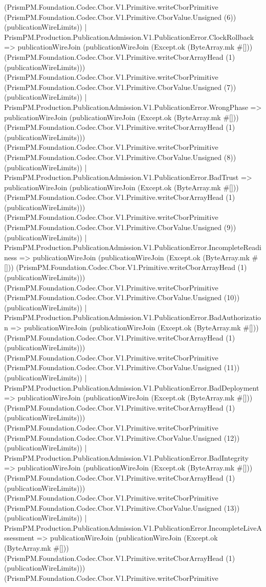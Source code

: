 \documentclass[11pt]{article}
\begin{document}
(PrismPM.Foundation.Codec.Cbor.V1.Primitive.writeCborPrimitive (PrismPM.Foundation.Codec.Cbor.V1.Primitive.CborValue.Unsigned (6)) (publicationWireLimits)) | PrismPM.Production.PublicationAdmission.V1.PublicationError.ClockRollback => publicationWireJoin (publicationWireJoin (Except.ok (ByteArray.mk \#[])) (PrismPM.Foundation.Codec.Cbor.V1.Primitive.writeCborArrayHead (1) (publicationWireLimits))) (PrismPM.Foundation.Codec.Cbor.V1.Primitive.writeCborPrimitive (PrismPM.Foundation.Codec.Cbor.V1.Primitive.CborValue.Unsigned (7)) (publicationWireLimits)) | PrismPM.Production.PublicationAdmission.V1.PublicationError.WrongPhase => publicationWireJoin (publicationWireJoin (Except.ok (ByteArray.mk \#[])) (PrismPM.Foundation.Codec.Cbor.V1.Primitive.writeCborArrayHead (1) (publicationWireLimits))) (PrismPM.Foundation.Codec.Cbor.V1.Primitive.writeCborPrimitive (PrismPM.Foundation.Codec.Cbor.V1.Primitive.CborValue.Unsigned (8)) (publicationWireLimits)) | PrismPM.Production.PublicationAdmission.V1.PublicationError.BadTrust => publicationWireJoin (publicationWireJoin (Except.ok (ByteArray.mk \#[])) (PrismPM.Foundation.Codec.Cbor.V1.Primitive.writeCborArrayHead (1) (publicationWireLimits))) (PrismPM.Foundation.Codec.Cbor.V1.Primitive.writeCborPrimitive (PrismPM.Foundation.Codec.Cbor.V1.Primitive.CborValue.Unsigned (9)) (publicationWireLimits)) | PrismPM.Production.PublicationAdmission.V1.PublicationError.IncompleteReadiness => publicationWireJoin (publicationWireJoin (Except.ok (ByteArray.mk \#[])) (PrismPM.Foundation.Codec.Cbor.V1.Primitive.writeCborArrayHead (1) (publicationWireLimits))) (PrismPM.Foundation.Codec.Cbor.V1.Primitive.writeCborPrimitive (PrismPM.Foundation.Codec.Cbor.V1.Primitive.CborValue.Unsigned (10)) (publicationWireLimits)) | PrismPM.Production.PublicationAdmission.V1.PublicationError.BadAuthorization => publicationWireJoin (publicationWireJoin (Except.ok (ByteArray.mk \#[])) (PrismPM.Foundation.Codec.Cbor.V1.Primitive.writeCborArrayHead (1) (publicationWireLimits))) (PrismPM.Foundation.Codec.Cbor.V1.Primitive.writeCborPrimitive (PrismPM.Foundation.Codec.Cbor.V1.Primitive.CborValue.Unsigned (11)) (publicationWireLimits)) | PrismPM.Production.PublicationAdmission.V1.PublicationError.BadDeployment => publicationWireJoin (publicationWireJoin (Except.ok (ByteArray.mk \#[])) (PrismPM.Foundation.Codec.Cbor.V1.Primitive.writeCborArrayHead (1) (publicationWireLimits))) (PrismPM.Foundation.Codec.Cbor.V1.Primitive.writeCborPrimitive (PrismPM.Foundation.Codec.Cbor.V1.Primitive.CborValue.Unsigned (12)) (publicationWireLimits)) | PrismPM.Production.PublicationAdmission.V1.PublicationError.BadIntegrity => publicationWireJoin (publicationWireJoin (Except.ok (ByteArray.mk \#[])) (PrismPM.Foundation.Codec.Cbor.V1.Primitive.writeCborArrayHead (1) (publicationWireLimits))) (PrismPM.Foundation.Codec.Cbor.V1.Primitive.writeCborPrimitive (PrismPM.Foundation.Codec.Cbor.V1.Primitive.CborValue.Unsigned (13)) (publicationWireLimits)) | PrismPM.Production.PublicationAdmission.V1.PublicationError.IncompleteLiveAssessment => publicationWireJoin (publicationWireJoin (Except.ok (ByteArray.mk \#[])) (PrismPM.Foundation.Codec.Cbor.V1.Primitive.writeCborArrayHead (1) (publicationWireLimits))) (PrismPM.Foundation.Codec.Cbor.V1.Primitive.writeCborPrimitive 
\end{document}
